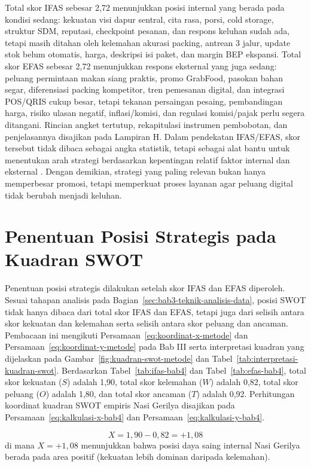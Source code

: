 Total skor IFAS sebesar 2,72 menunjukkan posisi internal yang berada pada kondisi sedang: kekuatan visi dapur sentral, cita rasa, porsi, cold storage, struktur SDM, reputasi, checkpoint pesanan, dan respons keluhan sudah ada, tetapi masih ditahan oleh kelemahan akurasi packing, antrean 3 jalur, update stok belum otomatis, harga, deskripsi isi paket, dan margin BEP ekspansi. Total skor EFAS sebesar 2,72 menunjukkan respons eksternal yang juga sedang: peluang permintaan makan siang praktis, promo GrabFood, pasokan bahan segar, diferensiasi packing kompetitor, tren pemesanan digital, dan integrasi POS/QRIS cukup besar, tetapi tekanan persaingan pesaing, pembandingan harga, risiko ulasan negatif, inflasi/komisi, dan regulasi komisi/pajak perlu segera ditangani. Rincian angket tertutup, rekapitulasi instrumen pembobotan, dan penjelasannya disajikan pada Lampiran H. Dalam pendekatan IFAS/EFAS, skor tersebut tidak dibaca sebagai angka statistik, tetapi sebagai alat bantu untuk menentukan arah strategi berdasarkan kepentingan relatif faktor internal dan eksternal \parencite{rangkuti2016analisisSWOT,david2023strategicmanagement}. Dengan demikian, strategi yang paling relevan bukan hanya memperbesar promosi, tetapi memperkuat proses layanan agar peluang digital tidak berubah menjadi keluhan.

\section{Penentuan Posisi Strategis pada Kuadran SWOT}
Penentuan posisi strategis dilakukan setelah skor IFAS dan EFAS diperoleh. Sesuai tahapan analisis pada Bagian~\ref{sec:bab3-teknik-analisis-data}, posisi SWOT tidak hanya dibaca dari total skor IFAS dan EFAS, tetapi juga dari selisih antara skor kekuatan dan kelemahan serta selisih antara skor peluang dan ancaman. Pembacaan ini mengikuti Persamaan~\ref{eq:koordinat-x-metode} dan Persamaan~\ref{eq:koordinat-y-metode} pada Bab III serta interpretasi kuadran yang dijelaskan pada Gambar~\ref{fig:kuadran-swot-metode} dan Tabel~\ref{tab:interpretasi-kuadran-swot}. Berdasarkan Tabel~\ref{tab:ifas-bab4} dan Tabel~\ref{tab:efas-bab4}, total skor kekuatan ($S$) adalah 1,90, total skor kelemahan ($W$) adalah 0,82, total skor peluang ($O$) adalah 1,80, dan total skor ancaman ($T$) adalah 0,92. Perhitungan koordinat kuadran SWOT empiris Nasi Gerilya disajikan pada Persamaan~\ref{eq:kalkulasi-x-bab4} dan Persamaan~\ref{eq:kalkulasi-y-bab4}.

\begin{equation}
    \label{eq:kalkulasi-x-bab4}
    X = 1{,}90 - 0{,}82 = +1{,}08
\end{equation}
di mana $X = +1{,}08$ menunjukkan bahwa posisi daya saing internal Nasi Gerilya berada pada area positif (kekuatan lebih dominan daripada kelemahan).

